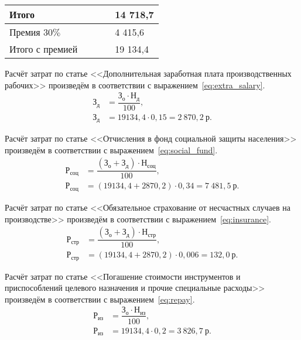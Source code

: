\begin{table}[h!]
{\begin{tabular}{| p{} | p{} | p{} |
                      p{} | p{} |}
      Итого               & & & & 14 718,7            \\ \hline
      Премия $30\%$       & & & & 4 415,6             \\ \hline
      Итого с премией     & & & & 19 134,4            \\ \hline

    \end{tabular}
  }
\end{table}

\newpage

Расчёт затрат по статье <<Дополнительная заработная плата производственных
рабочих>> произведём в соответствии с выражением~\ref{eq:extra_salary}.
\begin{align}
  \label{eq:extra_salary}
  \text{З}_{\text{д}} &= \dfrac{\text{З}_{\text{о}} \cdot
    \text{Н}_{\text{д}}}{100}, \\
  \text{З}_{\text{д}} &= 19134{,}4 \cdot 0{,}15 =
    2~870{,}2 \: \text{р.} \nonumber
\end{align}

Расчёт затрат по статье <<Отчисления в фонд социальной защиты населения>>
произведём в соответствии с выражением~\ref{eq:social_fund}.
\begin{align}
  \label{eq:social_fund}
  \text{Р}_{\text{соц}} &= \dfrac{(\text{З}_{\text{о}} + \text{З}_{\text{д}}) \cdot
    \text{Н}_{\text{соц}}}{100}, \\
  \text{Р}_{\text{соц}} &= (19134{,}4 + 2870{,}2) \cdot 0{,}34 =
    7~481{,}5 \: \text{р.} \nonumber
\end{align}

Расчёт затрат по статье <<Обязательное страхование от несчастных случаев
на производстве>> произведём в соответствии с выражением~\ref{eq:insurance}.
\begin{align}
  \label{eq:insurance}
  \text{Р}_{\text{стр}} &= \dfrac{(\text{З}_{\text{о}} + \text{З}_{\text{д}}) \cdot
    \text{Н}_{\text{стр}}}{100}, \\
  \text{Р}_{\text{стр}} &= (19134{,}4 + 2870{,}2) \cdot 0{,}006 =
    132{,}0 \: \text{р.} \nonumber
\end{align}

Расчёт затрат по статье <<Погашение стоимости инструментов и приспособлений
целевого назначения и прочие специальные расходы>>
произведём в соответствии с выражением~\ref{eq:repay}.
\begin{align}
  \label{eq:repay}
  \text{Р}_{\text{из}} &= \dfrac{\text{З}_{\text{о}} \cdot
    \text{Н}_{\text{из}}}{100}, \\
  \text{Р}_{\text{из}} &= 19134{,}4 \cdot 0{,}2 =
    3~826{,}7 \: \text{р.} \nonumber
\end{align}

